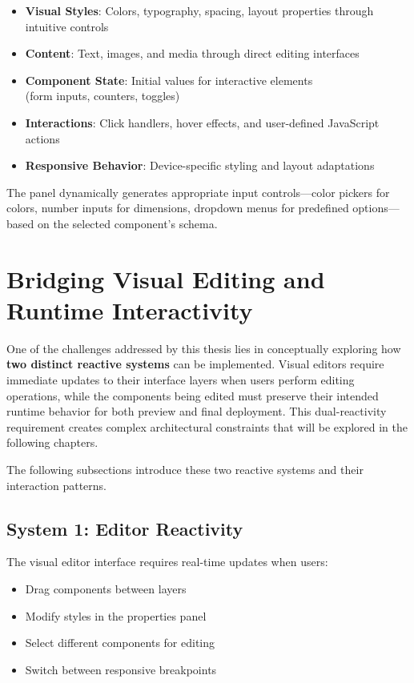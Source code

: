 \documentclass[oneside,12pt]{book}
\begin{document}
\begin{itemize}
    \item \textbf{Visual Styles}: Colors, typography, spacing, layout properties through intuitive controls
    \item \textbf{Content}: Text, images, and media through direct editing interfaces
    \item \textbf{Component State}: Initial values for interactive elements \\ (form inputs, counters, toggles)
    \item \textbf{Interactions}: Click handlers, hover effects, and user-defined JavaScript actions
    \item \textbf{Responsive Behavior}: Device-specific styling and layout adaptations
\end{itemize}

The panel dynamically generates appropriate input controls—color pickers for colors, number inputs for dimensions, dropdown menus for predefined options—based on the selected component's schema.

\section{Bridging Visual Editing and Runtime Interactivity}
\label{sec:bridging-challenge}

One of the challenges addressed by this thesis lies in conceptually exploring how \textbf{two distinct reactive systems} can be implemented.
Visual editors require immediate updates to their interface layers when users perform editing operations, while the components being edited must preserve their intended runtime behavior for both preview and final deployment.
This dual-reactivity requirement creates complex architectural constraints that will be explored in the following chapters.

The following subsections introduce these two reactive systems and their interaction patterns.

\subsection{System 1: Editor Reactivity}
The visual editor interface requires real-time updates when users:
\begin{itemize}
    \item Drag components between layers
    \item Modify styles in the properties panel
    \item Select different components for editing
    \item Switch between responsive breakpoints
\end{itemize}
\end{document}
